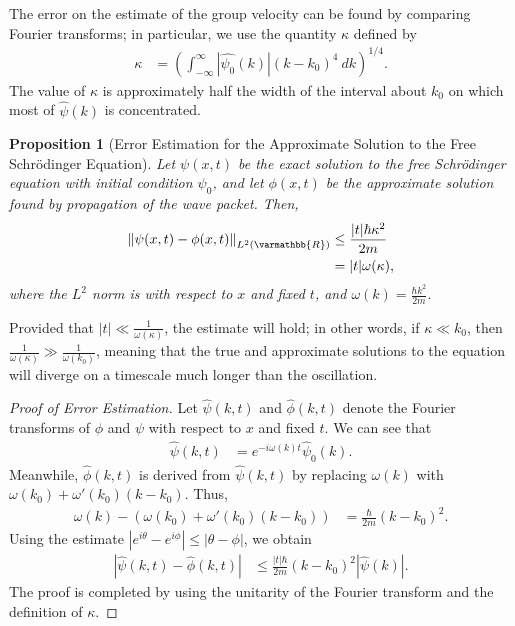 \documentclass[12pt]{extarticle}
\newcommand{\R}{\varmathbb{R}}
\newcommand{\norm}[1]{\left\Vert #1\right\Vert}
\theoremstyle{plain}
\newtheorem*{proposition}{Proposition}%
\theoremstyle{definition}
\theoremstyle{remark}
\begin{document}
    The error on the estimate of the group velocity can be found by comparing Fourier transforms; in particular, we use the quantity $\kappa$ defined by
    \begin{align*}
      \kappa &= \left(\int_{-\infty}^{\infty} \left\vert \hat{\psi_0}(k) \right\vert\left(k-k_0\right)^4\:dk\right)^{1/4}.
    \end{align*}
    The value of $\kappa$ is approximately half the width of the interval about $k_0$ on which most of $\hat{\psi}(k)$ is concentrated.
    \begin{proposition}[Error Estimation for the Approximate Solution to the Free Schrödinger Equation]
      Let $\psi(x,t)$ be the exact solution to the free Schrödinger equation with initial condition $\psi_0$, and let $\phi(x,t)$ be the approximate solution found by propagation of the wave packet. Then,
      \begin{align*}
        \norm{\psi(x,t) - \phi(x,t)}_{L^{2}(\R)} &\leq \frac{|t|\hbar \kappa^2}{2m}\\
                                                 &= |t|\omega(\kappa),
      \end{align*}
      where the $L^2$ norm is with respect to $x$ and fixed $t$, and $\omega(k) = \frac{\hbar k^2}{2m}$.
    \end{proposition}
    Provided that $|t| \ll \frac{1}{\omega(\kappa)}$, the estimate will hold; in other words, if $\kappa \ll k_0$, then $\frac{1}{\omega(\kappa)} \gg \frac{1}{\omega(k_0)}$, meaning that the true and approximate solutions to the equation will diverge on a timescale much longer than the oscillation.
    \begin{proof}[Proof of Error Estimation]
      Let $\hat{\psi}(k,t)$ and $\hat{\phi}(k,t)$ denote the Fourier transforms of $\phi$ and $\psi$ with respect to $x$ and fixed $t$. We can see that
      \begin{align*}
        \hat{\psi}(k,t) &= e^{-i\omega(k)t}\hat{\psi}_0(k).
      \end{align*}
      Meanwhile, $\hat{\phi}(k,t)$ is derived from $\hat{\psi}(k,t)$ by replacing $\omega(k)$ with $\omega(k_0) + \omega'(k_0)(k-k_0)$. Thus,
      \begin{align*}
        \omega(k) - \left(\omega(k_0) + \omega'(k_0)(k-k_0)\right) &= \frac{\hbar }{2m}(k-k_0)^2.
      \end{align*}
      Using the estimate $\left\vert e^{i\theta} - e^{i\phi} \right\vert \leq \left\vert \theta - \phi \right\vert$, we obtain
      \begin{align*}
        \left\vert \hat{\psi}(k,t) - \hat{\phi}(k,t) \right\vert &\leq \frac{|t|\hbar}{2m}(k-k_0)^2 \left\vert \hat{\psi}(k) \right\vert.
      \end{align*}
      The proof is completed by using the unitarity of the Fourier transform and the definition of $\kappa$.
    \end{proof}
\end{document}
